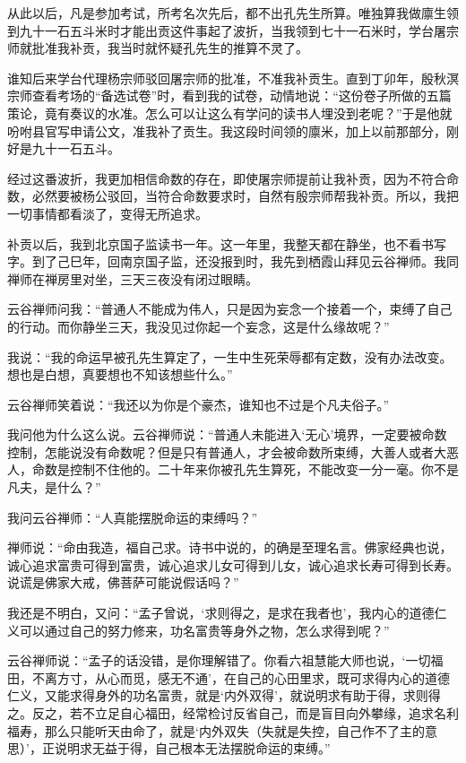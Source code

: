 \documentclass[12pt,UTF8]{ctexbook}
\begin{document}
从此以后，凡是参加考试，所考名次先后，都不出孔先生所算。唯独算我做廪生领到九十一石五斗米时才能出贡这件事起了波折，当我领到七十一石米时，学台屠宗师就批准我补贡，我当时就怀疑孔先生的推算不灵了。

谁知后来学台代理杨宗师驳回屠宗师的批准，不准我补贡生。直到丁卯年，殷秋溟宗师查看考场的“备选试卷”时，看到我的试卷，动情地说：“这份卷子所做的五篇策论，竟有奏议的水准。怎么可以让这么有学问的读书人埋没到老呢？”于是他就吩咐县官写申请公文，准我补了贡生。我这段时间领的廪米，加上以前那部分，刚好是九十一石五斗。

经过这番波折，我更加相信命数的存在，即使屠宗师提前让我补贡，因为不符合命数，必然要被杨公驳回，当符合命数要求时，自然有殷宗师帮我补贡。所以，我把一切事情都看淡了，变得无所追求。

补贡以后，我到北京国子监读书一年。这一年里，我整天都在静坐，也不看书写字。到了己巳年，回南京国子监，还没报到时，我先到栖霞山拜见云谷禅师。我同禅师在禅房里对坐，三天三夜没有闭过眼睛。

云谷禅师问我：“普通人不能成为伟人，只是因为妄念一个接着一个，束缚了自己的行动。而你静坐三天，我没见过你起一个妄念，这是什么缘故呢？”

我说：“我的命运早被孔先生算定了，一生中生死荣辱都有定数，没有办法改变。想也是白想，真要想也不知该想些什么。”

云谷禅师笑着说：“我还以为你是个豪杰，谁知也不过是个凡夫俗子。”

我问他为什么这么说。云谷禅师说：“普通人未能进入‘无心’境界，一定要被命数控制，怎能说没有命数呢？但是只有普通人，才会被命数所束缚，大善人或者大恶人，命数是控制不住他的。二十年来你被孔先生算死，不能改变一分一毫。你不是凡夫，是什么？”

我问云谷禅师：“人真能摆脱命运的束缚吗？”

禅师说：“命由我造，福自己求。诗书中说的，的确是至理名言。佛家经典也说，诚心追求富贵可得到富贵，诚心追求儿女可得到儿女，诚心追求长寿可得到长寿。说谎是佛家大戒，佛菩萨可能说假话吗？”

我还是不明白，又问：“孟子曾说，‘求则得之，是求在我者也’，我内心的道德仁义可以通过自己的努力修来，功名富贵等身外之物，怎么求得到呢？”

云谷禅师说：“孟子的话没错，是你理解错了。你看六祖慧能大师也说，‘一切福田，不离方寸，从心而觅，感无不通’，在自己的心田里求，既可求得内心的道德仁义，又能求得身外的功名富贵，就是‘内外双得’，就说明求有助于得，求则得之。反之，若不立足自心福田，经常检讨反省自己，而是盲目向外攀缘，追求名利福寿，那么只能听天由命了，就是‘内外双失（失就是失控，自己作不了主的意思）’，正说明求无益于得，自己根本无法摆脱命运的束缚。”
\end{document}
